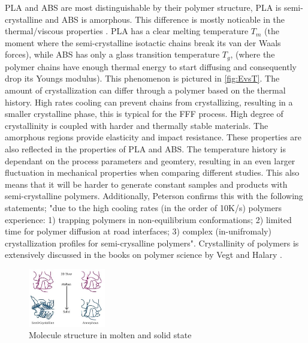 PLA and ABS are most distinguishable by their polymer structure,  PLA is semi-crystalline and ABS is amorphous. This difference is mostly noticable in the thermal/viscous properties \cite{Rodriguez-Panes2018TheAnalysis}. PLA has a clear melting temperature $T_m$ (the moment where the semi-crystalline isotactic chains break its van der Waals forces), while ABS has only a glass transition temperature $T_g$, (where the polymer chains have enough thermal energy to start diffusing and consequently drop its Youngs modulus). This phenomenon is pictured in \ref{fig:EvsT}. The amount of crystallization can differ through a polymer based on the thermal history. High rates cooling can prevent chains from crystallizing, resulting in a smaller crystalline phase, this is typical for the FFF process. High degree of crystallinity is coupled with harder and thermally stable materials\cite{Balani2015PhysicalPolymers}. The amorphous regions provide elasticity and impact resistance. These properties are also reflected in the properties of PLA and ABS. The temperature history is dependant on the process parameters and geomtery, resulting in an even larger fluctuation in mechanical properties when comparing different studies. This also means that it will be harder to generate constant samples and products with semi-crystalline polymers. Additionally, Peterson \cite{Peterson2019ReviewPerspective} confirms this with the following statements; "due to the high cooling rates (in the order of 10K/s) polymers experience: 1) trapping polymers in non-equilibrium conformations; 2) limited time for polymer diffusion at road interfaces; 3) complex (in-unifromaly) crystallization profiles for semi-crysalline polymers". Crystallinity of polymers is extensively discussed in the books on polymer science by Vegt \cite{Van_der_Vegt2001FromPlastics} and Halary \cite{Halary2011PolymerMaterials}.

\begin{figure}[H]
    \centering
    \includegraphics[width=0.3\textwidth]{chapter_2/figures/structurepolymers.PNG}
    \caption{Molecule structure in molten and solid state \cite{PtolinePolymersCrystalline}}
    \label{fig:structurepolymers}
\end{figure}


